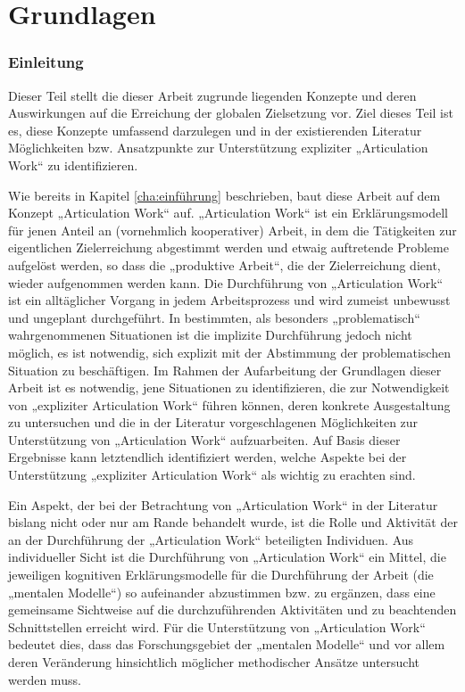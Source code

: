 \part{Grundlagen} %
\label{prt:grundlagen}

\section*{Einleitung} %
\label{sec:grundlagen_einleitung}


Dieser Teil stellt die dieser Arbeit zugrunde liegenden Konzepte und deren Auswirkungen auf die Erreichung der globalen Zielsetzung vor. Ziel dieses Teil ist es, diese Konzepte umfassend darzulegen und in der existierenden Literatur Möglichkeiten bzw. Ansatzpunkte zur Unterstützung expliziter „Articulation Work“ zu identifizieren.

Wie bereits in Kapitel \ref{cha:einführung} beschrieben, baut diese Arbeit auf dem Konzept „Articulation Work“ auf. „Articulation Work“ ist ein Erklärungsmodell für jenen Anteil an (vornehmlich kooperativer) Arbeit, in dem die Tätigkeiten zur eigentlichen Zielerreichung abgestimmt werden und etwaig auftretende Probleme aufgelöst werden, so dass die „produktive Arbeit“, die der Zielerreichung dient, wieder aufgenommen werden kann. Die Durchführung von „Articulation Work“ ist ein alltäglicher Vorgang in jedem Arbeitsprozess und wird zumeist unbewusst und ungeplant durchgeführt. In bestimmten, als besonders „problematisch“ wahrgenommenen Situationen ist die implizite Durchführung jedoch nicht  möglich, es ist notwendig, sich explizit mit der Abstimmung der problematischen Situation zu beschäftigen. Im Rahmen der Aufarbeitung der Grundlagen dieser Arbeit ist es notwendig, jene Situationen zu identifizieren, die zur Notwendigkeit von „expliziter Articulation Work“ führen können, deren konkrete Ausgestaltung zu untersuchen und die in der Literatur vorgeschlagenen Möglichkeiten zur Unterstützung von „Articulation Work“ aufzuarbeiten. Auf Basis dieser Ergebnisse kann letztendlich identifiziert werden, welche Aspekte bei der Unterstützung „expliziter Articulation Work“ als wichtig zu erachten sind.

Ein Aspekt, der bei der Betrachtung von „Articulation Work“ in der Literatur bislang nicht oder nur am Rande behandelt wurde, ist die Rolle und Aktivität der an der Durchführung der „Articulation Work“ beteiligten Individuen. Aus individueller Sicht ist die Durchführung von „Articulation Work“ ein Mittel, die jeweiligen kognitiven Erklärungsmodelle für die Durchführung der Arbeit (die „mentalen Modelle“) so aufeinander abzustimmen bzw. zu ergänzen, dass eine gemeinsame Sichtweise auf die durchzuführenden Aktivitäten und zu beachtenden Schnittstellen erreicht wird. Für die Unterstützung von „Articulation Work“ bedeutet dies, dass das Forschungsgebiet der „mentalen Modelle“ und vor allem deren Veränderung hinsichtlich möglicher methodischer Ansätze untersucht werden muss.

